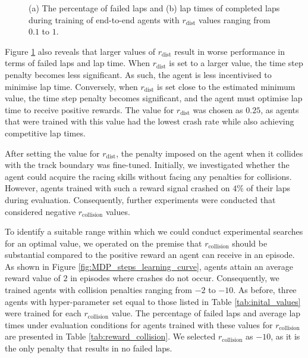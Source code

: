 \begin{figure}[htb!]
    \centering
    
    \caption[Learning curves of agents with different values for $r_{\text{dist}}$ during training]{(a) The percentage of failed laps and (b) lap times of completed laps during training of end-to-end agents with $r_{\text{dist}}$ values ranging from $0.1$ to $1$.}
    \label{fig:reward_signal_dist}
\end{figure}


Figure \ref{fig:reward_signal_dist} also reveals that larger values of $r_{\text{dist}}$ result in worse performance in terms of failed laps and lap time.
When $r_{\text{dist}}$ is set to a larger value, the time step penalty becomes less significant.
As such, the agent is less incentivised to minimise lap time.
Conversely, when $r_{\text{dist}}$ is set close to the estimated minimum value, the time step penalty becomes significant, and the agent must optimise lap time to receive positive rewards.
The value for $r_{\text{dist}}$ was chosen as $0.25$, as agents that were trained with this value had the lowest crash rate while also achieving competitive lap times.


After setting the value for $r_{\text{dist}}$, the penalty imposed on the agent when it collides with the track boundary was fine-tuned. 
Initially, we investigated whether the agent could acquire the racing skills without facing any penalties for collisions. 
However, agents trained with such a reward signal crashed on $4\%$ of their laps during evaluation. 
Consequently, further experiments were conducted that considered negative $r_{\text{collision}}$ values.

To identify a suitable range within which we could conduct experimental searches for an optimal value, we operated on the premise that $r_{\text{collision}}$ should be substantial compared to the positive reward an agent can receive in an episode. 
As shown in Figure \ref{fig:MDP_steps_learning_curve}, agents attain an average reward value of $2$ in episodes where crashes do not occur. 
Consequently, we trained agents with collision penalties ranging from $-2$ to $-10$.
As before, three agents with hyper-parameter set equal to those listed in Table \ref{tab:inital_values} were trained for each $r_{\text{collision}}$ value.
The percentage of failed laps and average lap times under evaluation conditions for agents trained with these values for $r_{\text{collision}}$ are presented in Table \ref{tab:reward_collision}.
We selected $r_{\text{collision}}$ as $-10$, as it is the only penalty that results in no failed laps.

